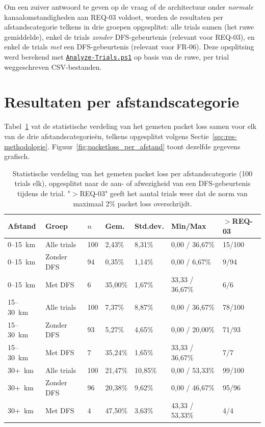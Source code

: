 Om een zuiver antwoord te geven op de vraag of de architectuur onder \emph{normale}
kanaalomstandigheden aan REQ-03 voldoet, worden de resultaten per afstandscategorie
telkens in drie groepen opgesplitst: alle trials samen (het ruwe gemiddelde), enkel de
trials \emph{zonder} DFS-gebeurtenis (relevant voor REQ-03), en enkel de trials
\emph{met} een DFS-gebeurtenis (relevant voor FR-06). Deze opsplitsing werd berekend met
\href{code/scripts/Analyze-Trials.ps1}{\texttt{Analyze-Trials.ps1}} op basis van de
ruwe, per trial weggeschreven CSV-bestanden.

\section{Resultaten per afstandscategorie}%
\label{sec:res-resultaten}

Tabel~\ref{tab:resultaten-per-afstand} vat de statistische verdeling van het gemeten
packet loss samen voor elk van de drie afstandscategorieën, telkens opgesplitst volgens
Sectie~\ref{sec:res-methodologie}. Figuur~\ref{fig:packetloss_per_afstand} toont
dezelfde gegevens grafisch.

\begin{table}[h]
  \centering
  \small
  \begin{tabular}{p{2.0cm}p{2.6cm}p{1.3cm}p{1.9cm}p{1.9cm}p{1.7cm}p{1.9cm}}
    \toprule
    \textbf{Afstand} & \textbf{Groep} & \textbf{$n$} & \textbf{Gem.} & \textbf{Std.dev.} & \textbf{Min/Max} & \textbf{$>$REQ-03} \\
    \midrule
    0--15~km & Alle trials        & 100 & 2{,}43\%  & 8{,}31\%  & 0{,}00 / 36{,}67\% & 15/100 \\
    0--15~km & Zonder DFS         & 94  & 0{,}35\%  & 1{,}14\%  & 0{,}00 / 6{,}67\%  & 9/94   \\
    0--15~km & Met DFS            & 6   & 35{,}00\% & 1{,}67\%  & 33{,}33 / 36{,}67\% & 6/6   \\
    \midrule
    15--30~km & Alle trials        & 100 & 7{,}37\%  & 8{,}87\%  & 0{,}00 / 36{,}67\% & 78/100 \\
    15--30~km & Zonder DFS         & 93  & 5{,}27\%  & 4{,}65\%  & 0{,}00 / 20{,}00\% & 71/93  \\
    15--30~km & Met DFS            & 7   & 35{,}24\% & 1{,}65\%  & 33{,}33 / 36{,}67\% & 7/7    \\
    \midrule
    30+~km & Alle trials        & 100 & 21{,}47\% & 10{,}85\% & 0{,}00 / 53{,}33\% & 99/100 \\
    30+~km & Zonder DFS         & 96  & 20{,}38\% & 9{,}62\%  & 0{,}00 / 46{,}67\% & 95/96  \\
    30+~km & Met DFS            & 4   & 47{,}50\% & 3{,}63\%  & 43{,}33 / 53{,}33\% & 4/4    \\
    \bottomrule
  \end{tabular}
  \caption{Statistische verdeling van het gemeten packet loss per afstandscategorie
  (100 trials elk), opgesplitst naar de aan- of afwezigheid van een DFS-gebeurtenis
  tijdens de trial. "$>$REQ-03" geeft het aantal trials weer dat de norm van maximaal
  2\% packet loss overschrijdt.}
  \label{tab:resultaten-per-afstand}
\end{table}

